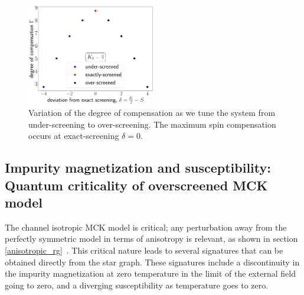 \documentclass[reprint,prb,superscriptaddress]{revtex4-2}
\begin{document}
\begin{figure}[!htpb]
	\centering
	\includegraphics[width=0.5\textwidth]{../numerics/deg_of_comp.pdf}
	\caption{Variation of the degree of compensation as we tune the system from under-screening to over-screening. The maximum spin compensation occurs at exact-screening \(\delta=0\).}
\end{figure}

\subsection{Impurity magnetization and susceptibility: Quantum criticality of overscreened MCK model}
The channel isotropic MCK model is critical; any perturbation away from the perfectly symmetric model in terms of anisotropy is relevant, as shown in section \ref{anisotropic_rg}~\cite{vojta_2006,andrew_bulla_2011,pang_cox_1991}. This critical nature leads to several signatures that can be obtained directly from the star graph. These signatures include a discontinuity in the impurity magnetization at zero temperature in the limit of the external field going to zero, and a diverging susceptibility as temperature goes to zero.
\end{document}

